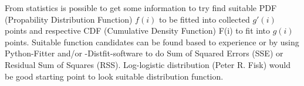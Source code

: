 From statistics is possible to get some information to try find suitable
PDF (Propability Distribution Function) $f(i)$ to be fitted into collected $g'(i)$
points and respective CDF (Cumulative Density Function) F(i) to fit into $g(i)$ points.
Suitable function candidates can be found based to experience or by using Python-Fitter
and/or -Distfit-software to do Sum of Squared Errors (SSE) or Residual Sum of Squares (RSS).
Log-logistic distribution (Peter R. Fisk) would be good starting point to look suitable distribution function.

